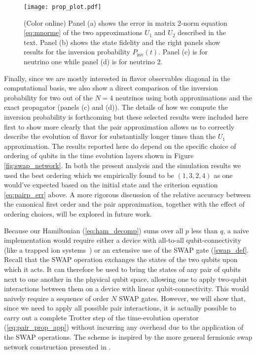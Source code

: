 \documentclass[Dual]{msu-thesis}
\begin{document}
\begin{figure}[h]
\centering
\texttt{[image: prop\_plot.pdf]}
\caption{(Color online) Panel (a) shows the error in matrix 2-norm equation \eqref{eq:mnorme} of the two approximations $U_1$ and $U_2$ described in the text. Panel (b) shows the state fidelity and the right panels show results for the inversion probability $P_{\text{inv}}(t)$. Panel (c) is for neutrino one while panel (d) is for neutrino 2.}
\label{fig:prop_cmp}
\end{figure}

Finally, since we are mostly interested in flavor observables diagonal in the computational basis, we also show a direct comparison of the inversion probability for two out of the $N=4$ neutrinos using both approximations and the exact propagator (panels (c) and (d)). The details of how we compute the inversion probability is forthcoming but these selected results were included here first to show more clearly that the pair approximation allows us to correctly describe the evolution of flavor for substantially longer times than the $U_1$ approximation. The results reported here do depend on the specific choice of ordering of qubits in the time evolution layers shown in Figure \ref{fig:swap_network}. In both the present analysis and the simulation results we used the best ordering which we empirically found to be $(1,3,2,4)$ as one would've expected based on the initial state and the criterion equation \eqref{eq:pairp_err} above. A more rigorous discussion of the relative accuracy between the canonical first order and the pair approximation, together with the effect of ordering choices, will be explored in future work.

Because our Hamiltonian (\ref{eq:ham_decomp}) sums over all $p$ less than $q$, a naive implementation would require either a device with all-to-all qubit-connectivity (like a trapped ion systems~\cite{Monroe2019}) or an extensive use of the SWAP gate (\ref{swap_def}. Recall that the SWAP operation exchanges the states of the two qubits upon which it acts. It can therefore be used to bring the states of any pair of qubits next to one another in the physical qubit space, allowing one to apply two-qubit interactions between them on a device with linear qubit-connectivity. This would naively require a sequence of order $N$ SWAP gates. However, we will show that, since we need to apply all possible pair interactions, it is actually possible to carry out a complete Trotter step of the time-evolution operator (\eqref{eq:pair_prop_app}) without incurring any overhead due to the application of the SWAP operations. The scheme is inspired by the more general fermionic swap network construction presented in \cite{Kivlichan2018}. 
\end{document}
